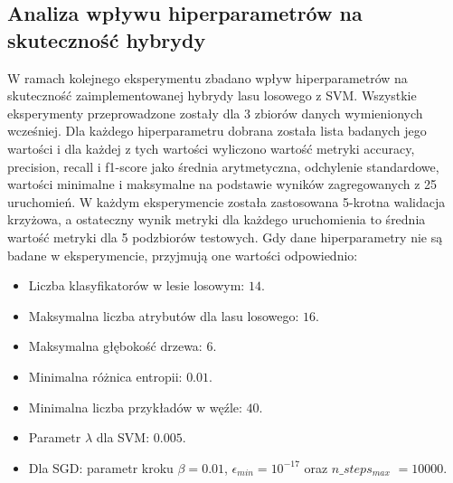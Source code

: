 \documentclass[
    left=2.5cm,         %
    right=2.5cm,        %
    top=2.5cm,          %
    bottom=3cm,         %
    bindingoffset=6mm,  %
    nohyphenation=false %
]{eiti/eiti-report}
\begin{document}
\subsection{Analiza wpływu hiperparametrów na skuteczność hybrydy}
W ramach kolejnego eksperymentu zbadano wpływ hiperparametrów na skuteczność zaimplementowanej hybrydy lasu losowego z SVM.
Wszystkie eksperymenty przeprowadzone zostały dla 3 zbiorów danych wymienionych wcześniej. Dla każdego hiperparametru dobrana została lista badanych jego wartości i dla każdej z tych wartości wyliczono wartość metryki accuracy, precision, recall i f1-score jako średnia arytmetyczna, odchylenie standardowe, wartości minimalne i maksymalne na podstawie wyników zagregowanych z 25 uruchomień. W każdym eksperymencie została zastosowana 5-krotna walidacja krzyżowa, a ostateczny wynik metryki dla każdego uruchomienia to średnia wartość metryki dla 5 podzbiorów testowych.
Gdy dane hiperparametry nie są badane w eksperymencie, przyjmują one wartości odpowiednio:
\begin{itemize}
    \item Liczba klasyfikatorów w lesie losowym: $14$.
    \item Maksymalna liczba atrybutów dla lasu losowego: $16$.
    \item Maksymalna głębokość drzewa: $6$.
    \item Minimalna różnica entropii: $0.01$.
    \item Minimalna liczba przykładów w węźle: $40$.
    \item Parametr $\lambda$ dla SVM: $0.005$.
    \item Dla SGD: parametr kroku $\beta=0.01$, $\epsilon_{min}=10^{-17}$ oraz $n\_steps_{max}$ $=10000$.
\end{itemize}
\end{document}
